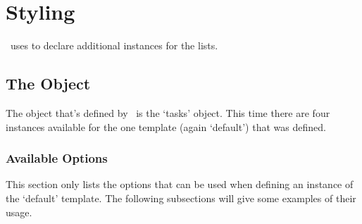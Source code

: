 \documentclass[load-preamble+]{cnltx-doc}
\begin{document}



\section{Styling \Tasks}
\Tasks\ uses  to declare additional instances for the lists.

\subsection{The  Object}\label{sec:tasks}
The object that's defined by \Tasks\ is the `tasks' object.  This time there
are four instances available for the one template (again `default') that was
defined.

\subsubsection{Available Options}
This section only lists the options that can be used when defining an instance
of the `default' template.  The following subsections will give some examples
of their usage.
\end{document}
